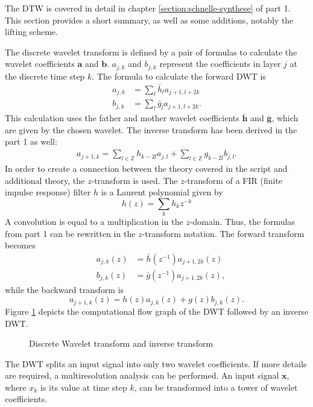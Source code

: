 \begin{refsection}
The DTW is covered in detail in chapter \ref{section:schnelle-synthese} of part 1.
This section provides a short summary, as well as some additions, notably the lifting scheme.

The discrete wavelet transform is defined by a pair of formulas to calculate the wavelet coefficients $\bm a$ and $\bm b$.
$a_{j,k}$ and $b_{j,k}$ represent the coefficients in layer $j$ at the discrete time step $k$.
The formula to calculate the forward DWT is
\begin{align}
a_{j,k} &= \sum_{l} \bar{h}_l a_{j+1,l+2k}
\\
b_{j,k} &= \sum_{l} \bar{g}_l a_{j+1,l+2k} .
\end{align}
This calculation uses the father and mother wavelet coefficients $\bm{\bar h}$ and $\bm{\bar g}$, which are given by the chosen wavelet.
The inverse transform has been derived in the part 1 as well: 
\begin{align}
a_{j+1,k} =
\sum_{l\in\mathbb Z}
h_{k-2l}
a_{j,l}
+
\sum_{l\in\mathbb Z}
g_{k-2l}
b_{j,l} .
\end{align}
In order to create a connection between the theory covered in the script and additional theory, the $z$-transform is used.
The $z$-transform of a FIR (finite impulse response) filter $h$ is a Laurent polynomial given by
\begin{equation}
h(z) = \sum_{k} h_k z^{-k}
\end{equation}
A convolution is equal to a multiplication in the $z$-domain.
Thus, the formulas from part 1 can be rewritten in the $z$-transform notation.
The forward transform becomes
\begin{align}
\quad a_{j,k}(z) &= \bar h(z^{-1}) a_{j+1,2k}(z) 
\\
\quad b_{j,k}(z) &= \bar g(z^{-1}) a_{j+1,2k}(z),
\end{align}
while the backward transform is
\begin{equation}
a_{j+1,k}(z) = h(z) a_{j,k}(z) + g(z) b_{j,k}(z).
\end{equation}
Figure \ref{fpga:fig:dwt} depicts the computational flow graph of the DWT followed by an inverse DWT.
\begin{figure}
	\centering
	
	\caption{Discrete Wavelet transform and inverse transform}
	\label{fpga:fig:dwt}
\end{figure}
The DWT splits an input signal into only two wavelet coefficients.
If more details are required, a multiresolution analysis can be performed.
An input signal $\bm x$, where $x_k$ is its value at time step $k$, can be transformed into a tower of wavelet coefficients.

\end{refsection}
